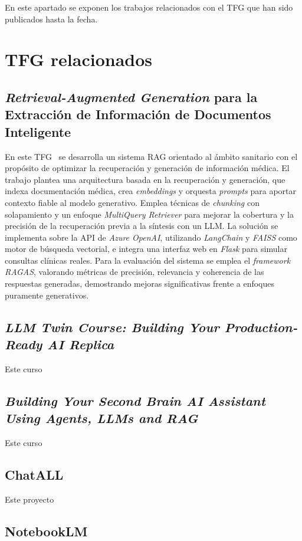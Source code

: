 
En este apartado se exponen los trabajos relacionados con el TFG que han sido publicados hasta la fecha. 
\section{TFG relacionados}
\subsection{\textit{Retrieval-Augmented Generation} para la Extracción de Información de Documentos Inteligente}
En este TFG~\cite{trabajorelacionado:Daniel} se desarrolla un sistema RAG orientado al ámbito sanitario con el propósito de optimizar la recuperación y generación de información médica. El trabajo plantea una arquitectura basada en la recuperación y generación, que indexa documentación médica, crea \textit{embeddings} y orquesta \textit{prompts} para aportar contexto fiable al modelo generativo. Emplea técnicas de \textit{chunking} con solapamiento y un enfoque \textit{MultiQuery Retriever} para mejorar la cobertura y la precisión de la recuperación previa a la síntesis con un LLM. La solución se implementa sobre la API de \textit{Azure OpenAI}, utilizando \textit{LangChain} y \textit{FAISS} como motor de búsqueda vectorial, e integra una interfaz web en \textit{Flask} para simular consultas clínicas reales. Para la evaluación del sistema se emplea el \textit{framework RAGAS}, valorando métricas de precisión, relevancia y coherencia de las respuestas generadas, demostrando mejoras significativas frente a enfoques puramente generativos. 

\subsection{\textit{LLM Twin Course: Building Your Production-Ready AI Replica}}
Este curso~\cite{trabajorelacionado:LLM_twin}

\subsection{\textit{Building Your Second Brain AI Assistant Using Agents, LLMs and RAG}}
Este curso~\cite{trabajorelacionado:second_brain}

\subsection{ChatALL}
Este proyecto~\cite{trabajorelacionado:ChatAll}

\subsection{NotebookLM}